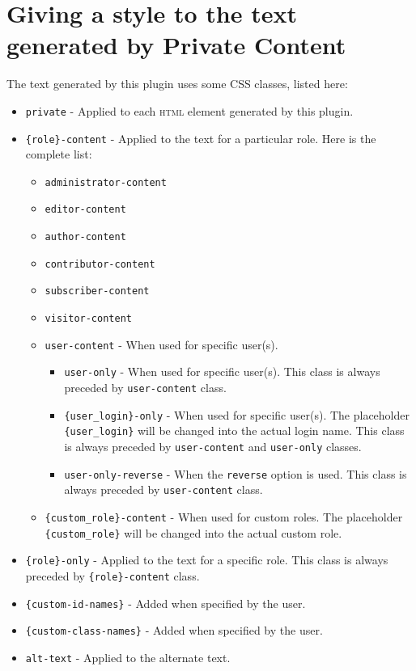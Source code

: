 \documentclass[
	titlepage,
	headinclude,
	abstract=on,
	paper=a4,
	fontsize=11pt,
]{scrartcl}
\begin{document}
\section{Giving a style to the text generated by Private Content}

The text generated by this plugin uses some CSS classes, listed here:

\begin{itemize}
 \item \verb+private+ - Applied to each \textsc{html} element generated by this plugin.
 \item \verb+{role}-content+ - Applied to the text for a particular role. Here is the complete list:
 \begin{itemize}
  \item \verb+administrator-content+
  \item \verb+editor-content+
  \item \verb+author-content+
  \item \verb+contributor-content+
  \item \verb+subscriber-content+
  \item \verb+visitor-content+
  \item \verb+user-content+ - When used for specific user(s).
  \begin{itemize}
   \item \verb+user-only+ - When used for specific user(s). This class is always preceded by \verb+user-content+ class.
    \item \verb+{user_login}-only+ - When used for specific user(s). The placeholder \verb+{user_login}+ will be changed into the actual login name. This class is always preceded by \verb+user-content+ and \verb+user-only+ classes.
    \item \verb+user-only-reverse+ - When the \verb+reverse+ option is used. This class is always preceded by \verb+user-content+ class.
  \end{itemize}
  \item \verb+{custom_role}-content+ - When used for custom roles. The placeholder \verb+{custom_role}+ will be changed into the actual custom role.
  \end{itemize}
 \item \verb+{role}-only+ - Applied to the text for a specific role. This class is always preceded by \verb+{role}-content+ class.
 \item \verb+{custom-id-names}+ - Added when specified by the user.
 \item \verb+{custom-class-names}+ - Added when specified by the user.
 \item \verb+alt-text+ - Applied to the alternate text.
\end{itemize}
\end{document}
